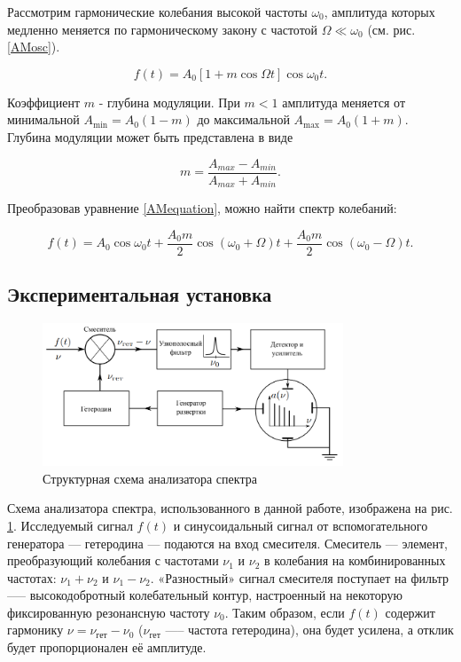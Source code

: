 \documentclass[a4paper,12pt]{article} %
\begin{document}
Рассмотрим гармонические колебания высокой частоты $\omega_0$, амплитуда которых медленно меняется по гармоническому закону с частотой $\Omega \ll \omega_0$ (см. рис. \ref{AMosc}).

\begin{equation}
    f(t) = A_0 \left[1+m\cos \Omega t\right] \cos \omega_0 t.
    \label{AMequation}
\end{equation}

Коэффициент $m$ - глубина модуляции. При $m < 1$ амплитуда меняется от минимальной $A_{\text{min}} = A_0(1 - m)$ до максимальной $A_{\text{max}} = A_0(1 + m)$. Глубина модуляции может быть представлена в виде

\begin{equation}
    m = \dfrac{A_{max} - A_{min}}{A_{max} + A_{min}}.
\end{equation}

Преобразовав уравнение \eqref{AMequation}, можно найти спектр колебаний:

\begin{equation}
    f(t) = A_0 \cos \omega_0 t + \dfrac{A_0 m}{2} \cos \left(\omega_0 + \Omega\right)t + \dfrac{A_0 m}{2}\cos\left(\omega_0 - \Omega\right)t.
\end{equation}

\subsection{Экспериментальная установка}

\begin{figure}[h]
    \centering
    \includegraphics[width=0.8\textwidth]{setup.png} 
    \caption{Структурная схема анализатора спектра}
    \label{setup}
\end{figure}

Схема анализатора спектра, использованного в данной работе, изображена на рис. \ref{setup}. Исследуемый сигнал $f(t)$ и синусоидальный сигнал от вспомогательного генератора --- гетеродина --- подаются на вход смесителя. Смеситель — элемент, преобразующий колебания с частотами $\nu_1$ и $\nu_2$ в колебания на комбинированных частотах: $\nu_1 + \nu_2$ и $\nu_1 - \nu_2$. «Разностный» сигнал смесителя поступает на фильтр --— высокодобротный колебательный контур, настроенный на некоторую фиксированную резонансную частоту $\nu_0$. Таким образом, если $f(t)$ содержит гармонику $\nu = \nu_\text{гет} - \nu_0$ ($\nu_\text{гет}$ —-- частота гетеродина), она будет усилена, а отклик будет пропорционален её амплитуде.
\end{document}
